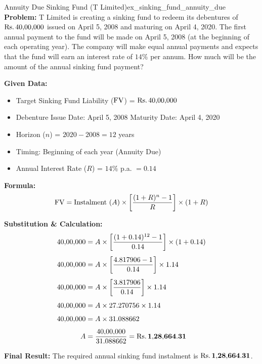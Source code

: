 \begin{example}{Annuity Due Sinking Fund (T Limited)}{ex_sinking_fund_annuity_due}
\textbf{Problem:}
T Limited is creating a sinking fund to redeem its debentures of $\text{Rs.}\, 40{,}00{,}000$ issued on April 5, 2008 and maturing on April 4, 2020. The first annual payment to the fund will be made on April 5, 2008 (at the beginning of each operating year). The company will make equal annual payments and expects that the fund will earn an interest rate of $14\%$ per annum. How much will be the amount of the annual sinking fund payment?

\tcbline
\textbf{Given Data:}
\begin{itemize}[noitemsep]
    \item Target Sinking Fund Liability ($\operatorname{FV}$) = $\text{Rs.}\, 40{,}00{,}000$
    \item Debenture Issue Date: April 5, 2008 \qquad Maturity Date: April 4, 2020
    \item Horizon ($n$) = $2020 - 2008 = 12$ years
    \item Timing: Beginning of each year (Annuity Due)
    \item Annual Interest Rate ($R$) = $14\%$ p.a. $= 0.14$
\end{itemize}

\textbf{Formula:}
\begin{equation*}
    \operatorname{FV} = \text{Instalment } (A) \times \left[ \frac{(1 + R)^n - 1}{R} \right] \times (1 + R)
\end{equation*}

\textbf{Substitution \& Calculation:}
\begin{align*}
    40{,}00{,}000 &= A \times \left[ \frac{(1 + 0.14)^{12} - 1}{0.14} \right] \times (1 + 0.14) \\[0.4em]
    40{,}00{,}000 &= A \times \left[ \frac{4.817906 - 1}{0.14} \right] \times 1.14 \\[0.4em]
    40{,}00{,}000 &= A \times \left[ \frac{3.817906}{0.14} \right] \times 1.14 \\[0.4em]
    40{,}00{,}000 &= A \times 27.270756 \times 1.14 \\[0.4em]
    40{,}00{,}000 &= A \times 31.088662 \\[0.4em]
    A &= \frac{40{,}00{,}000}{31.088662} = \mathbf{\text{Rs.}\, 1{,}28{,}664.31}
\end{align*}

\textbf{Final Result:}
The required annual sinking fund instalment is $\mathbf{\text{Rs.}\, 1{,}28{,}664.31}$.
\end{example}

